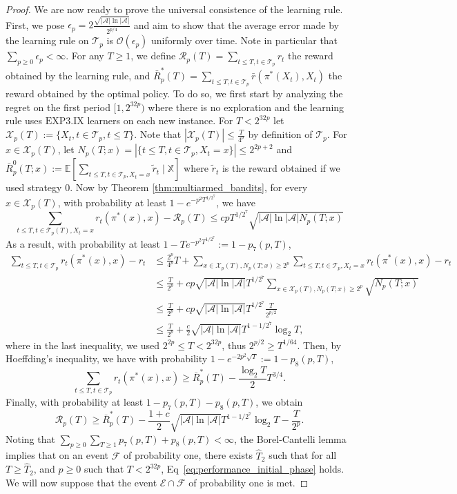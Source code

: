 \documentclass[aos]{imsart}
\theoremstyle{plain}
\theoremstyle{remark}
\newcommand{\Acal}{\mathcal{A}}
\newcommand{\Ecal}{\mathcal{E}}
\newcommand{\Fcal}{\mathcal{F}}
\newcommand{\Rcal}{\mathcal{R}}
\newcommand{\Tcal}{\mathcal{T}}
\newcommand{\Xcal}{\mathcal{X}}
\newcommand{\Ocal}{\mathcal{O}}
\newcommand{\Ebb}{\mathbb{E}}
\newcommand{\Xbb}{\mathbb{X}}
\newcommand{\1}{\mathbbm{1}}%
\newcommand{\EXPIX}{\mathrm{EXP3.IX}}
\begin{document}
\begin{proof}
We are now ready to prove the universal consistence of the learning rule. First, we pose $\epsilon_p = 2\frac{\sqrt{|\Acal|\ln|\Acal|}}{2^{p/4}}$ and aim to show that the average error made by the learning rule on $\Tcal_p$ is $\Ocal(\epsilon_p)$ uniformly over time. Note in particular that $\sum_{p\geq 0}\epsilon_p<\infty$. For any $T\geq 1$, we define $\Rcal_p(T) = \sum_{t\leq T,t\in\Tcal_p}r_t$ the reward obtained by the learning rule, and $\bar R^*_p(T)=\sum_{t\leq T,t\in\Tcal_p}\bar r(\pi^*(X_t), X_t)$ the reward obtained by the optimal policy. To do so, we first start by analyzing the regret on the first period $[1,2^{32p})$ where there is no exploration and the learning rule uses $\EXPIX$ learners on each new instance. For $T<2^{32p}$ let $\Xcal_p(T):=\{X_t,t\in\Tcal_p, t\leq T\}$. Note that $|\Xcal_p(T)|\leq\frac{T}{4^p}$ by definition of $\Tcal_p$. For $x\in\Xcal_p(T)$, let $N_p(T;x)=|\{t\leq T, t\in\Tcal_p, X_t=x\}|\leq 2^{2p+2}$ and $\bar R^0_p(T;x):=\Ebb[\sum_{t\leq T,t\in\Tcal_p, X_t=x} \tilde r_t \mid \Xbb]$ where $\tilde r_t$ is the reward obtained if we used strategy 0. Now by Theorem \ref{thm:multiarmed_bandits}, for every $x\in\Xcal_p(T)$, with probability at least $1-e^{- p^2T^{1/2^7}}$, we have
\begin{equation*}
    \sum_{t\leq T, t\in\Tcal_p(T),X_t=x} r_t(\pi^*(x), x) - \Rcal_p(T)  \leq cp T^{1/2^7}\sqrt{|\Acal|\ln|\Acal|N_p(T;x)}
\end{equation*}
As a result, with probability at least $1-Te^{- p^2T^{1/2^7}}:=1-p_7(p,T)$,
\begin{align*}
    \sum_{t\leq T,t\in\Tcal_p}r_t (\pi^*(x), x)-r_t  
    &\leq \frac{2^p}{4^p}T + \sum_{x\in\Xcal_p(T),N_p(T;x)\geq 2^p} \sum_{t\leq T,t\in\Tcal_p,X_t=x}r_t (\pi^*(x), x)-r_t \\
    &\leq \frac{T}{2^p} +  cp\sqrt{|\Acal|\ln|\Acal|}T^{1/2^7} \sum_{x\in\Xcal_p(T), N_p(T;x)\geq 2^p}\sqrt{N_p(T;x)}\\
    &\leq \frac{T}{2^p} +  cp\sqrt{|\Acal|\ln|\Acal|}T^{1/2^7} \frac{T}{2^{p/2}}\\
    &\leq \frac{T}{2^p} +  \frac{c}{2}\sqrt{|\Acal|\ln|\Acal|}T^{1-1/2^7}\log_2 T,
\end{align*}
where in the last inequality, we used $2^{2p}\leq T<2^{32p}$, thus $2^{p/2}\geq T^{1/64}$. Then, by Hoeffding's inequality, we have with probability $1-e^{-2p^2\sqrt T}:=1-p_8(p,T)$,
\begin{equation*}
    \sum_{t\leq T,t\in\Tcal_p}r_t (\pi^*(x), x)\geq \bar R^*_p(T) - \frac{\log_2 T}{2}T^{3/4}.
\end{equation*}
Finally, with probability at least $1-p_7(p,T)-p_8(p,T)$, we obtain
\begin{equation}\label{eq:performance_initial_phase}
    \Rcal_p(T) \geq \bar R^*_p(T) -  \frac{1+c}{2}\sqrt{|\Acal|\ln|\Acal|}T^{1-1/2^7}\log_2 T -\frac{T}{2^p}.
\end{equation}
Noting that $\sum_{p\geq 0}\sum_{T\geq 1}p_7(p,T)+p_8(p,T)<\infty$, the Borel-Cantelli lemma implies that on an event $\Fcal$ of probability one, there exists $\hat T_2$ such that for all $T\geq \hat T_2$, and $p\geq 0$ such that $T<2^{32p}$, Eq~\eqref{eq:performance_initial_phase} holds. We will now suppose that the event $\Ecal\cap\Fcal$ of probability one is met.


\end{proof}
\end{document}

